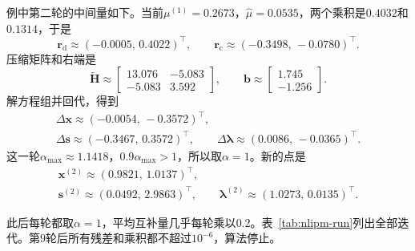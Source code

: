 例中第二轮的中间量如下。当前$\mu^{(1)}=0.2673$，$\hat{\mu}=0.0535$，两个乘积是$0.4032$和$0.1314$，于是
\[
 \bm{r}_{\mathrm{d}}\approx(-0.0005,\,0.4022)^\top,\qquad\bm{r}_{\mathrm{c}}\approx(-0.3498,\,-0.0780)^\top.
\]
压缩矩阵和右端是
\[
 \tilde{\bm{H}}\approx\begin{bmatrix}13.076&-5.083\\-5.083&3.592\end{bmatrix},\qquad\bm{b}\approx\begin{bmatrix}1.745\\-1.256\end{bmatrix}.
\]
解方程组并回代，得到
\[
 \begin{gathered}
 \Delta\bm{x}\approx(-0.0054,\,-0.3572)^\top,\\
 \Delta\bm{s}\approx(-0.3467,\,0.3572)^\top,\qquad\Delta\bm{\lambda}\approx(0.0086,\,-0.0365)^\top.
 \end{gathered}
\]
这一轮$\alpha_{\max}\approx1.1418$，$0.9\alpha_{\max}>1$，所以取$\alpha=1$。新的点是
\[
 \begin{gathered}
 \bm{x}^{(2)}\approx(0.9821,\,1.0137)^\top,\\
 \bm{s}^{(2)}\approx(0.0492,\,2.9863)^\top,\qquad\bm{\lambda}^{(2)}\approx(1.0273,\,0.0135)^\top.
 \end{gathered}
\]

此后每轮都取$\alpha=1$，平均互补量几乎每轮乘以$0.2$。表~\ref{tab:nlipm-run}列出全部迭代。第$9$轮后所有残差和乘积都不超过$10^{-6}$，算法停止。

